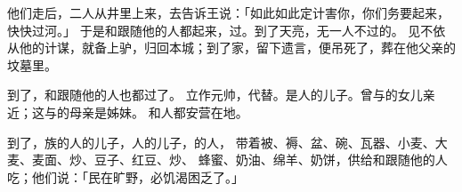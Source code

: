 {\par }{\PP {}他们走后，二人从井里上来，去告诉{}王说：「{}如此如此定计害你，你们务要起来，快快过河。」
于是{}和跟随他的人都起来，过{}。到了天亮，无一人不过{}的。
见不依从他的计谋，就备上驴，归回本城；到了家，留下遗言，便吊死了，葬在他父亲的坟墓里。
\par }{\PP {}到了{}，{}和跟随他的{}人也都过了{}。
立{}作元帅，代替{}。{}是{}人的儿子。{}曾与{}的女儿{}亲近；这{}与{}的母亲{}是姊妹。
和{}人都安营在{}地。
\par }{\PP {}到了{}，{}族的{}人{}的儿子{}，{}人{}的儿子{}，{}的{}人{}，
带着被、褥、盆、碗、瓦器、小麦、大麦、麦面、炒{}、豆子、红豆、炒{}、
蜂蜜、奶油、绵羊、奶饼，供给{}和跟随他的人吃；他们说：「民在旷野，必饥渴困乏了。」

}
